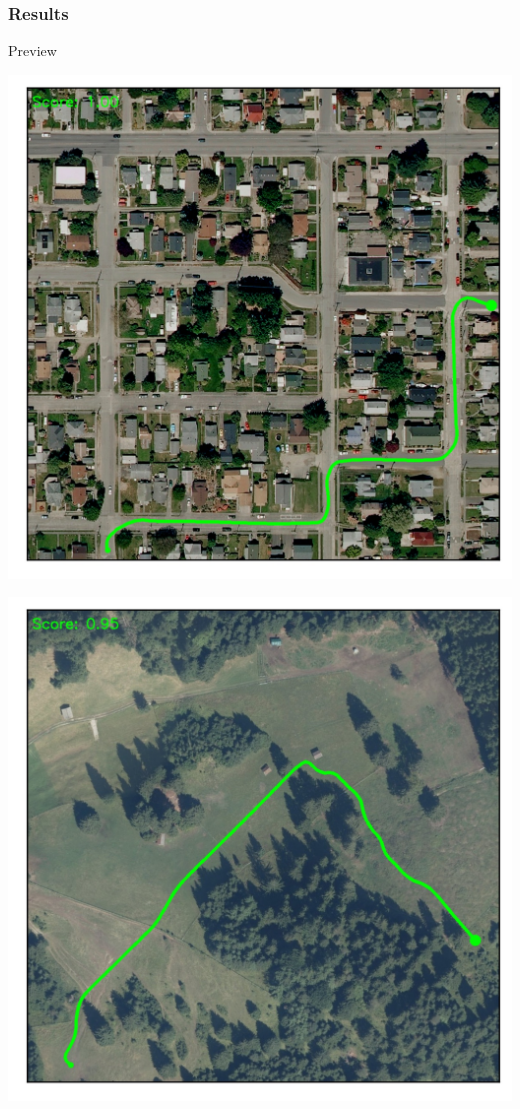 \documentclass[usenames,dvipsnames,10pt]{beamer}
\begin{document}
\begin{frame}
\frametitle{Results}
\centering
Preview \\[0.5cm]
\begin{minipage}[]{0.31\textwidth}
	\centering
	\includegraphics[width=\textwidth]{graphics/path-6}
\end{minipage}
\hspace{0.25cm}
\begin{minipage}[]{0.3\textwidth}
	\centering
	\includegraphics[width=\textwidth]{graphics/path-2}

\end{minipage}
\end{frame}
\end{document}
